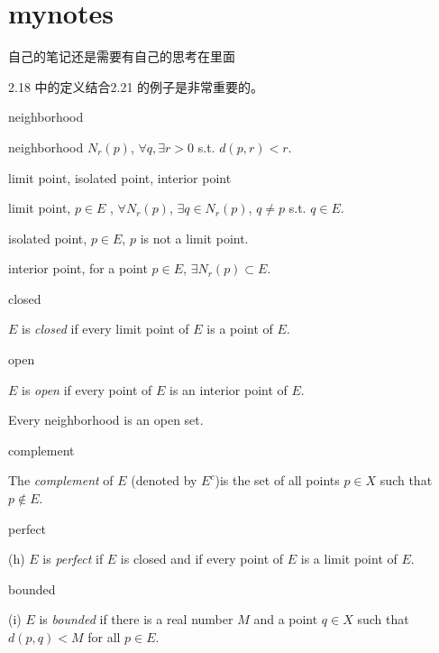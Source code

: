 \section*{mynotes}
自己的笔记还是需要有自己的思考在里面

2.18 中的定义结合2.21 的例子是非常重要的。

\begin{definition}neighborhood

    neighborhood $N_r(p)$, $\forall q, \exists r>0$ s.t. $d(p,r)<r$.
\end{definition}

\begin{definition}limit point, isolated point, interior point

    limit point, $p\in E$ , $\forall N_r(p)$, $\exists q\in N_r(p)$, $q\neq p$ s.t. $q\in E$.

    isolated point, $p\in E$, $p$ is not a limit point.

    interior point, for a point $p \in E$, $\exists N_r(p)\subset E$.
\end{definition}

\begin{definition} closed

    $E$ is \emph{closed} if every limit point of $E$ is a point of $E$.
\end{definition}

\begin{definition} open

    $E$ is \emph{open} if every point of $E$ is an interior point of $E$.
\end{definition}

\begin{mynewthm}
    Every neighborhood is an open set.
\end{mynewthm}

\begin{definition} complement
    
    The \emph{complement} of $E$ (denoted by $E^c$)is the set of all points $p \in X$ such that $p \not\in E$.
\end{definition}

\begin{definition} perfect
    
    (h) $E$ is \emph{perfect} if $E$ is closed and if every point of $E$ is a limit point of $E$.
\end{definition}
    
\begin{definition} bounded
    
    (i) $E$ is \emph{bounded} if there is a real number $M$ and a point $q \in X$ such that $d(p,q)< M$ for all $p \in E$.
\end{definition}    

